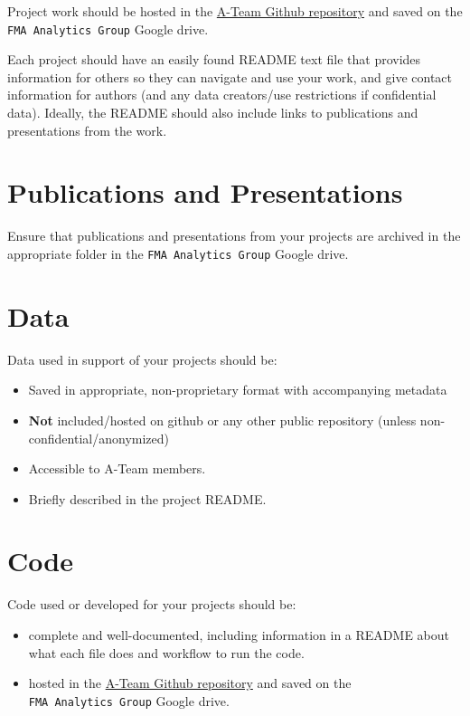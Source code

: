\documentclass[
  letterpaper,
  DIV=11,
  numbers=noendperiod]{scrreprt}
\providecommand{\tightlist}{%
  \setlength{\itemsep}{0pt}\setlength{\parskip}{0pt}}\usepackage{longtable,booktabs,array}
\begin{document}
Project work should be hosted in the
\href{https://github.com/Alaska-Fisheries-Monitoring-Analytics}{A-Team
Github repository} and saved on the \texttt{FMA\ Analytics\ Group}
Google drive.

Each project should have an easily found README text file that provides
information for others so they can navigate and use your work, and give
contact information for authors (and any data creators/use restrictions
if confidential data). Ideally, the README should also include links to
publications and presentations from the work.

\hypertarget{publications-and-presentations}{%
\section{Publications and
Presentations}\label{publications-and-presentations}}

Ensure that publications and presentations from your projects are
archived in the appropriate folder in the \texttt{FMA\ Analytics\ Group}
Google drive.

\hypertarget{data}{%
\section{Data}\label{data}}

Data used in support of your projects should be:

\begin{itemize}
\tightlist
\item
  Saved in appropriate, non-proprietary format with accompanying
  metadata
\item
  \textbf{Not} included/hosted on github or any other public repository
  (unless non-confidential/anonymized)\\
\item
  Accessible to A-Team members.
\item
  Briefly described in the project README.
\end{itemize}

\hypertarget{code-1}{%
\section{Code}\label{code-1}}

Code used or developed for your projects should be:

\begin{itemize}
\tightlist
\item
  complete and well-documented, including information in a README about
  what each file does and workflow to run the code.
\item
  hosted in the
  \href{https://github.com/Alaska-Fisheries-Monitoring-Analytics}{A-Team
  Github repository} and saved on the \texttt{FMA\ Analytics\ Group}
  Google drive.
\end{itemize}
\end{document}
